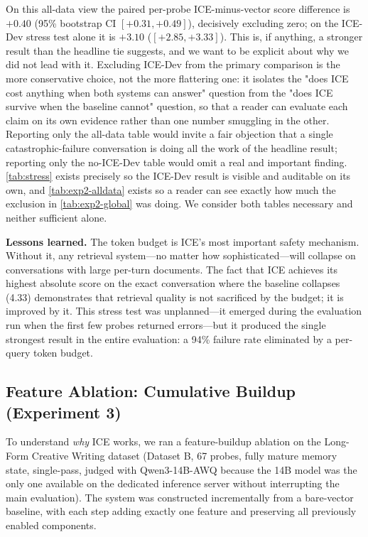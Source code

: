 \documentclass[10pt]{article}
\begin{document}
On this all-data view the paired per-probe ICE-minus-vector score difference is $+0.40$ (95\% bootstrap CI $[+0.31, +0.49]$), decisively excluding zero; on the ICE-Dev stress test alone it is $+3.10$ ($[+2.85, +3.33]$). This is, if anything, a stronger result than the headline tie suggests, and we want to be explicit about why we did not lead with it. Excluding ICE-Dev from the primary comparison is the more conservative choice, not the more flattering one: it isolates the "does ICE cost anything when both systems can answer" question from the "does ICE survive when the baseline cannot" question, so that a reader can evaluate each claim on its own evidence rather than one number smuggling in the other. Reporting only the all-data table would invite a fair objection that a single catastrophic-failure conversation is doing all the work of the headline result; reporting only the no-ICE-Dev table would omit a real and important finding. \cref{tab:stress} exists precisely so the ICE-Dev result is visible and auditable on its own, and \cref{tab:exp2-alldata} exists so a reader can see exactly how much the exclusion in \cref{tab:exp2-global} was doing. We consider both tables necessary and neither sufficient alone.

\textbf{Lessons learned.} The token budget is ICE's most important safety mechanism. Without it, any retrieval system---no matter how sophisticated---will collapse on conversations with large per-turn documents. The fact that ICE achieves its highest absolute score on the exact conversation where the baseline collapses (4.33) demonstrates that retrieval quality is not sacrificed by the budget; it is improved by it. This stress test was unplanned---it emerged during the evaluation run when the first few probes returned errors---but it produced the single strongest result in the entire evaluation: a 94\% failure rate eliminated by a per-query token budget.

\subsection{Feature Ablation: Cumulative Buildup (Experiment 3)}
\label{sec:ablation}

To understand \emph{why} ICE works, we ran a feature-buildup ablation on the Long-Form Creative Writing dataset (Dataset B, 67 probes, fully mature memory state, single-pass, judged with Qwen3-14B-AWQ because the 14B model was the only one available on the dedicated inference server without interrupting the main evaluation). The system was constructed incrementally from a bare-vector baseline, with each step adding exactly one feature and preserving all previously enabled components.
\end{document}
